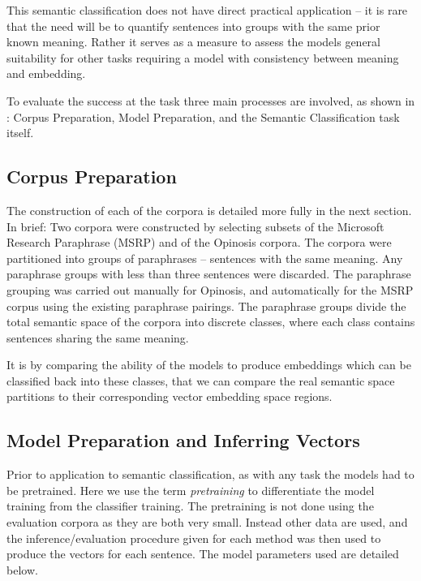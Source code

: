 \documentclass[]{book}
\begin{document}
This semantic classification does not have direct practical application
-- it is rare that the need will be to quantify sentences into groups
with the same prior known meaning. Rather it serves as a measure to
assess the models general suitability for other tasks requiring a
model with consistency between meaning and embedding.

To evaluate the success at the task three main processes are involved,
as shown in : Corpus Preparation, Model Preparation,
and the Semantic Classification task itself.


\subsection{Corpus Preparation}

The construction of each of the corpora is detailed more fully in
the next section. In brief: Two corpora were constructed by selecting
subsets of the Microsoft Research Paraphrase (MSRP) \citep{msrParapharaCorpus}
and of the Opinosis \citep{ganesan2010opinosis} corpora. The corpora
were partitioned into groups of paraphrases -- sentences with the
same meaning. Any paraphrase groups with less than three sentences
were discarded. The paraphrase grouping was carried out manually for
Opinosis, and automatically for the MSRP corpus using the existing
paraphrase pairings. The paraphrase groups divide the total semantic
space of the corpora into discrete classes, where each class contains
sentences sharing the same meaning.

It is by comparing the ability of the models to produce embeddings
which can be classified back into these classes, that we can compare
the real semantic space partitions to their corresponding vector embedding
space regions.


\subsection{Model Preparation and Inferring Vectors}

Prior to application to semantic classification, as with any task
the models had to be pretrained. Here we use the term \emph{pretraining}
to differentiate the model training from the classifier training.
The pretraining is not done using the evaluation corpora as they are
both very small. Instead other data are used, and the inference/evaluation
procedure given for each method was then used to produce the vectors
for each sentence. The model parameters used are detailed below.
\end{document}
